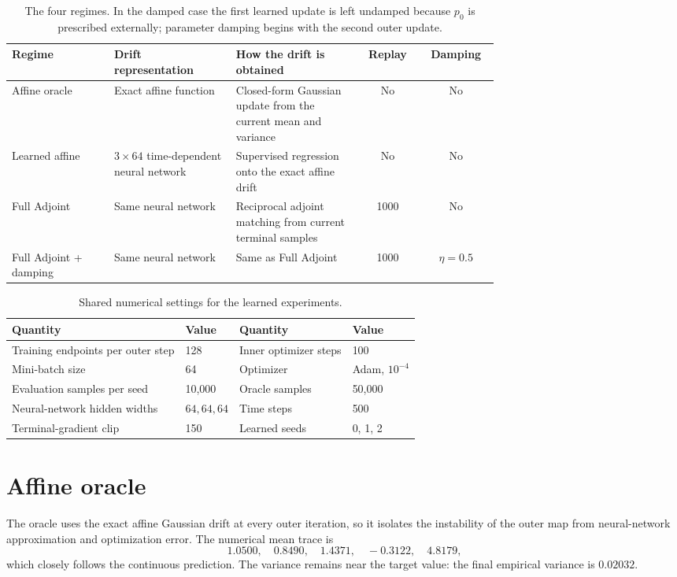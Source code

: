 \documentclass[10pt]{article}
\begin{document}
\begin{table}[h]
\centering
\small
\begin{tabular}{@{}p{0.21\linewidth}p{0.25\linewidth}p{0.26\linewidth}cc@{}}
\toprule
\textbf{Regime} & \textbf{Drift representation} & \textbf{How the drift is obtained} & \textbf{Replay} & \textbf{Damping} \\
\midrule
Affine oracle & Exact affine function & Closed-form Gaussian update from the current mean and variance & No & No \\
Learned affine & $3\times 64$ time-dependent neural network & Supervised regression onto the exact affine drift & No & No \\
Full Adjoint & Same neural network & Reciprocal adjoint matching from current terminal samples & 1000 & No \\
Full Adjoint + damping & Same neural network & Same as Full Adjoint & 1000 & $\eta=0.5$ \\
\bottomrule
\end{tabular}
\caption{The four regimes. In the damped case the first learned update is left undamped because $p_0$ is prescribed externally; parameter damping begins with the second outer update.}
\end{table}

\begin{table}[h]
\centering
\small
\begin{tabular}{@{}ll@{\qquad}ll@{}}
\toprule
\textbf{Quantity} & \textbf{Value} & \textbf{Quantity} & \textbf{Value} \\
\midrule
Training endpoints per outer step & 128 & Inner optimizer steps & 100 \\
Mini-batch size & 64 & Optimizer & Adam, $10^{-4}$ \\
Evaluation samples per seed & 10,000 & Oracle samples & 50,000 \\
Neural-network hidden widths & $64,64,64$ & Time steps & 500 \\
Terminal-gradient clip & 150 & Learned seeds & 0, 1, 2 \\
\bottomrule
\end{tabular}
\caption{Shared numerical settings for the learned experiments.}
\end{table}

\section{Affine oracle}

The oracle uses the exact affine Gaussian drift at every outer iteration, so it isolates the instability of the outer map from neural-network approximation and optimization error. The numerical mean trace is
\[
1.0500,\quad 0.8490,\quad 1.4371,\quad -0.3122,\quad 4.8179,
\]
which closely follows the continuous prediction. The variance remains near the target value: the final empirical variance is $0.02032$.
\end{document}
